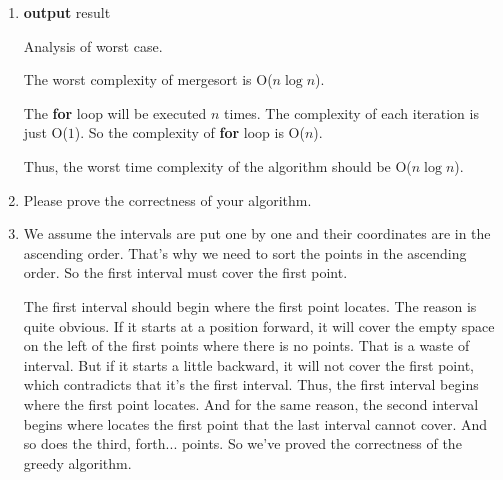 \documentclass[12pt,a4paper]{article}
\makeatletter
\newtheorem*{solution}{Solution}
\theoremstyle{definition}
\renewenvironment{solution}[1][Solution] {\par\pushQED{\qed}\normalfont\topsep6\p@\@plus6\p@\relax\trivlist\item[\hskip\labelsep\bfseries#1\@addpunct{.}]\ignorespaces}{\popQED\endtrivlist\@endpefalse} \makeatother
\makeatother
\begin{document}
\begin{enumerate}
\begin{enumerate}
\begin{solution}
\begin{minipage}[t]{0.9\textwidth}
\begin{algorithm}[H]
{{                    }
                }
                \textbf{output} result\;
            \end{algorithm}
            \end{minipage}
            \BlankLine
            Analysis of worst case.\par
            The worst complexity of mergesort is O($n\log n$).\par
            The \textbf{for} loop will be executed $n$ times. The complexity of each iteration is just O($1$). So the complexity of \textbf{for} loop is O($n$).\par
            Thus, the worst time complexity of the algorithm should be O($n\log n$).
            \end{solution}

        \item Please prove the correctness of your algorithm.\par
            \begin{solution}
            We assume the intervals are put one by one and their coordinates are in the ascending order. That's why we need to sort the points in the ascending order. So the first interval must cover the first point.

            The first interval should begin where the first point locates. The reason is quite obvious. If it starts at a position forward, it will cover the empty space on the left of the first points where there is no points. That is a waste of interval. But if it starts a little backward, it will not cover the first point, which contradicts that it's the first interval. Thus, the first interval begins where the first point locates. And for the same reason, the second interval begins where locates the first point that the last interval cannot cover. And so does the third, forth... points. So we've proved the correctness of the greedy algorithm.

            \end{solution}


\end{enumerate}
\end{enumerate}
\end{document}

